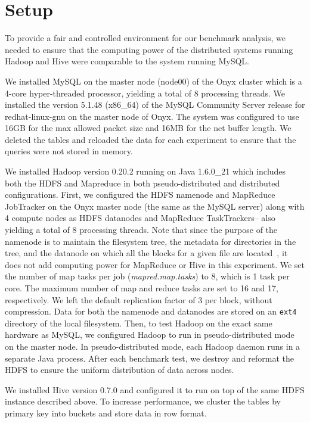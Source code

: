 \section{Setup}
To provide a fair and controlled environment for our benchmark analysis, we needed to ensure that the computing power of the distributed systems running Hadoop and Hive were comparable to the system running MySQL. 

We installed MySQL on the master node (node00) of the Onyx cluster which is a 4-core hyper-threaded processor, yielding a total of 8 processing threads. We installed the version 5.1.48 (x86\_64) of the MySQL Community Server release for redhat-linux-gnu on the master node of Onyx. The system was configured to use 16GB for the max allowed packet size and 16MB for the net buffer length. We deleted the tables and reloaded the data for each experiment to ensure that the queries were not stored in memory.

We installed Hadoop version 0.20.2 running on Java 1.6.0\_21 which includes both the HDFS and Mapreduce in both pseudo-distributed and distributed configurations. First, we configured the HDFS namenode and MapReduce JobTracker on the Onyx master node (the same as the MySQL server) along with 4 compute nodes as HDFS datanodes and MapReduce TaskTrackers-- also yielding a total of 8 processing threads. Note that since the purpose of the namenode is to maintain the filesystem tree, the metadata for directories in the tree, and the datanode on which all the blocks for a given file are located~\cite{white}, it does not add computing power for MapReduce or Hive in this experiment. We set the number of map tasks per job (\textit{mapred.map.tasks}) to 8, which is 1 task per core. The maximum number of map and reduce tasks are set to 16 and 17, respectively. We left the default replication factor of 3 per block, without compression. Data for both the namenode and datanodes are stored on an \texttt{ext4} directory of the local filesystem. Then, to test Hadoop on the exact same hardware as MySQL, we configured Hadoop to run in pseudo-distributed mode on the master node. In pseudo-distributed mode, each Hadoop daemon runs in a separate Java process. After each benchmark test, we destroy and reformat the HDFS to ensure the uniform distribution of data across nodes. 

We installed Hive version 0.7.0 and configured it to run on top of the same HDFS instance described above. To increase performance, we cluster the tables by primary key into buckets and store data in row format.

